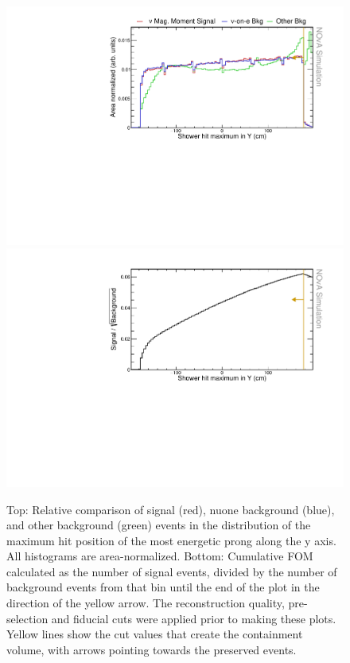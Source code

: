 \begin{figure}[hbtp]
\centering
\includegraphics[width=.9\textwidth]{Plots/NuMMEventSelection/N1Cut_maxY.pdf}
\includegraphics[width=.9\textwidth]{Plots/NuMMEventSelection/NuMM_N1Cut_maxYleft_FOMStats}
\caption[Hit maximum y containment cut]{Top: Relative comparison of signal (red), \acrshort{nuone} background (blue), and other background (green) events in the distribution of the maximum hit position of the most energetic prong along the y axis. All histograms are area-normalized. Bottom: Cumulative \acrshort{FOM} calculated as the number of signal events, divided by the number of background events from that bin until the end of the plot in the direction of the yellow arrow. The reconstruction quality, pre-selection and fiducial cuts were applied prior to making these plots. Yellow lines show the cut values that create the containment volume, with arrows pointing towards the preserved events.}
\label{fig:NuMMContainmentCutMaxY}
\end{figure}

